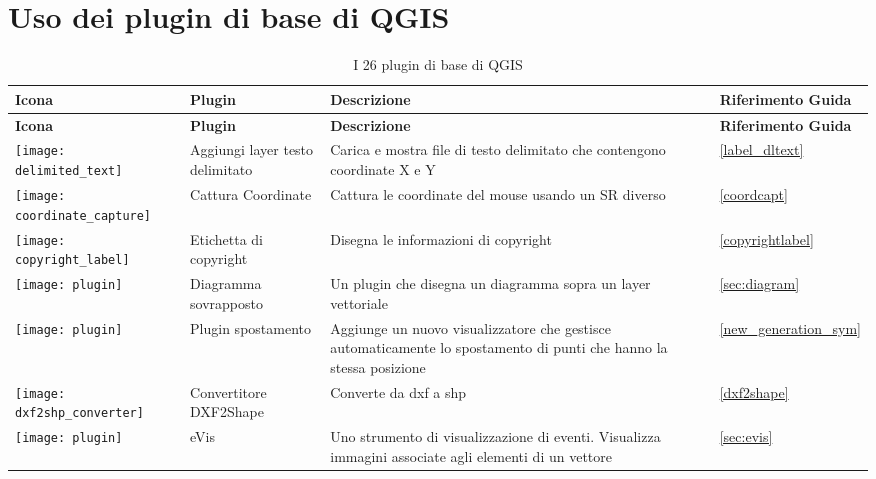 
\chapter{Uso dei plugin di base di QGIS}\label{sec:core_plugins}


{\setlength{\extrarowheight}{15pt}
\small
\begin{longtable}{|p{1.2cm}|p{3.8cm}|p{7.5cm}|p{3cm}|}
\caption{I 26 plugin di base di QGIS}\label{tab:core_plugins} \\
\hline
 \textbf{Icona} & \textbf{Plugin} & \textbf{Descrizione} & \textbf{Riferimento Guida}\\
\endfirsthead
\hline
\textbf{Icona} & \textbf{Plugin} & \textbf{Descrizione} & \textbf{Riferimento Guida}\\
\endhead
\hline
\texttt{[image: delimited\_text]}
 & Aggiungi layer testo delimitato \index{plugins!testo delimitato} & Carica e mostra file di testo delimitato che contengono coordinate X e Y &  \ref{label_dltext}\\
\hline
\texttt{[image: coordinate\_capture]}
 & Cattura Coordinate \index{plugins!cattura coordinate}& Cattura le coordinate del mouse usando un SR diverso\ &  \ref{coordcapt}\\
\hline 
\texttt{[image: copyright\_label]}
 & Etichetta di copyright \index{plugins!copyright}& Disegna le informazioni di copyright &  \ref{copyrightlabel}\\
\hline
\texttt{[image: plugin]}
 & Diagramma sovrapposto \index{plugins!diagramma}& Un plugin che disegna un diagramma sopra un layer vettoriale &  \ref{sec:diagram}\\
\hline
\texttt{[image: plugin]}
 & Plugin spostamento \index{plugins!spostamento punti}& Aggiunge un nuovo visualizzatore che gestisce automaticamente lo spostamento di punti che hanno la stessa posizione &  \ref{new_generation_sym}\\
\hline
\texttt{[image: dxf2shp\_converter]}
 & Convertitore DXF2Shape \index{plugins!DXF2Shape}& Converte da dxf a shp &  \ref{dxf2shape}\\
\hline
\texttt{[image: plugin]}
 & eVis & Uno strumento di visualizzazione di eventi. Visualizza immagini associate agli elementi di un vettore &  \ref{sec:evis}\\

\end{longtable}}
